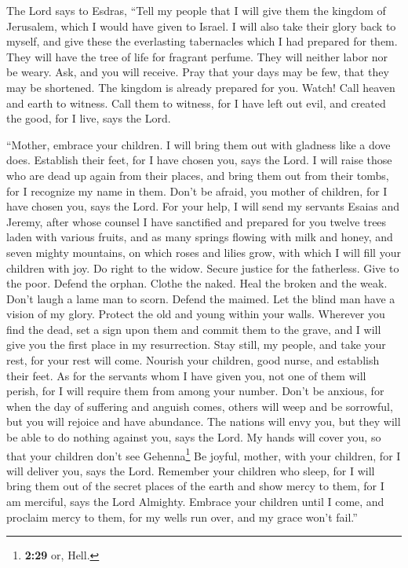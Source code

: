  The Lord says to Esdras, ``Tell my people that I will
give them the kingdom of Jerusalem, which I would have given to Israel.
 I will also take their glory back to myself, and give
these the everlasting tabernacles which I had prepared for them.
 They will have the tree of life for fragrant perfume.
They will neither labor nor be weary.  Ask, and you will
receive. Pray that your days may be few, that they may be shortened. The
kingdom is already prepared for you. Watch!  Call heaven
and earth to witness. Call them to witness, for I have left out evil,
and created the good, for I live, says the Lord.

 ``Mother, embrace your children. I will bring them out
with gladness like a dove does. Establish their feet, for I have chosen
you, says the Lord.  I will raise those who are dead up
again from their places, and bring them out from their tombs, for I
recognize my name in them.  Don't be afraid, you mother
of children, for I have chosen you, says the Lord.  For
your help, I will send my servants Esaias and Jeremy, after whose
counsel I have sanctified and prepared for you twelve trees laden with
various fruits,  and as many springs flowing with milk
and honey, and seven mighty mountains, on which roses and lilies grow,
with which I will fill your children with joy.  Do right
to the widow. Secure justice for the fatherless. Give to the poor.
Defend the orphan. Clothe the naked.  Heal the broken and
the weak. Don't laugh a lame man to scorn. Defend the maimed. Let the
blind man have a vision of my glory.  Protect the old and
young within your walls.  Wherever you find the dead, set
a sign upon them and commit them to the grave, and I will give you the
first place in my resurrection.  Stay still, my people,
and take your rest, for your rest will come.  Nourish
your children, good nurse, and establish their feet.  As
for the servants whom I have given you, not one of them will perish, for
I will require them from among your number.  Don't be
anxious, for when the day of suffering and anguish comes, others will
weep and be sorrowful, but you will rejoice and have abundance.
 The nations will envy you, but they will be able to do
nothing against you, says the Lord.  My hands will cover
you, so that your children don't see Gehenna\footnote{\textbf{2:29} or,
  Hell.}  Be joyful, mother, with your children, for I
will deliver you, says the Lord.  Remember your children
who sleep, for I will bring them out of the secret places of the earth
and show mercy to them, for I am merciful, says the Lord Almighty.
 Embrace your children until I come, and proclaim mercy
to them, for my wells run over, and my grace won't fail.''

